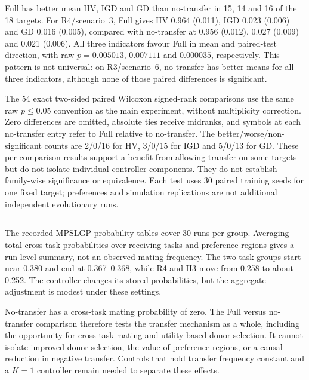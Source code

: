 Full has better mean HV, IGD and GD than no-transfer in 15, 14 and 16 of the 18 targets. For R4/scenario~3, Full gives HV 0.964 (0.011), IGD 0.023 (0.006) and GD 0.016 (0.005), compared with no-transfer at 0.956 (0.012), 0.027 (0.009) and 0.021 (0.006). All three indicators favour Full in mean and paired-test direction, with raw $p=0.005013$, $0.007111$ and $0.000035$, respectively. This pattern is not universal: on R3/scenario~6, no-transfer has better means for all three indicators, although none of those paired differences is significant.

The 54 exact two-sided paired Wilcoxon signed-rank comparisons use the same raw $p\leq0.05$ convention as the main experiment, without multiplicity correction. Zero differences are omitted, absolute ties receive midranks, and symbols at each no-transfer entry refer to Full relative to no-transfer. The better/worse/non-significant counts are 2/0/16 for HV, 3/0/15 for IGD and 5/0/13 for GD. These per-comparison results support a benefit from allowing transfer on some targets but do not isolate individual controller components. They do not establish family-wise significance or equivalence. Each test uses 30 paired training seeds for one fixed target; preferences and simulation replications are not additional independent evolutionary runs.



\subsection{}
The recorded MPSLGP probability tables cover 30 runs per group. Averaging total cross-task probabilities over receiving tasks and preference regions gives a run-level summary, not an observed mating frequency. The two-task groups start near 0.380 and end at 0.367--0.368, while R4 and H3 move from 0.258 to about 0.252. The controller changes its stored probabilities, but the aggregate adjustment is modest under these settings.

No-transfer has a cross-task mating probability of zero. The Full versus no-transfer comparison therefore tests the transfer mechanism as a whole, including the opportunity for cross-task mating and utility-based donor selection. It cannot isolate improved donor selection, the value of preference regions, or a causal reduction in negative transfer. Controls that hold transfer frequency constant and a $K=1$ controller remain needed to separate these effects.

